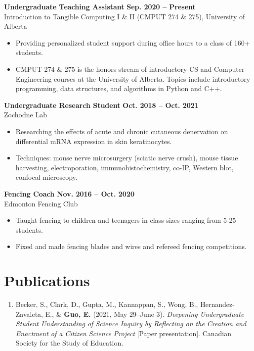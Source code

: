 \documentclass{article}
\begin{document}
\textbf{Undergraduate Teaching Assistant} \hfill \textbf{Sep. 2020 -- Present}\\
Introduction to Tangible Computing I \& II (CMPUT 274 \& 275), University of Alberta
\begin{itemize}
    \item Providing personalized student support during office hours to a class of 160+ students.
    \item CMPUT 274 \& 275 is the honors stream of introductory CS and Computer Engineering courses at the University of Alberta. Topics include introductory programming, data structures, and algorithms in Python and C++.
\end{itemize}

\textbf{Undergraduate Research Student} \hfill \textbf{Oct. 2018 -- Oct. 2021}\\
Zochodne Lab
\begin{itemize}
    \item Researching the effects of acute and chronic cutaneous denervation on differential mRNA expression in skin keratinocytes.
    \item Techniques: mouse nerve microsurgery (sciatic nerve crush), mouse tissue harvesting, electroporation, immunohistochemistry, co-IP, Western blot, confocal microscopy.
\end{itemize}

\textbf{Fencing Coach} \hfill \textbf{Nov. 2016 -- Oct. 2020}\\
Edmonton Fencing Club
\begin{itemize}
    \item Taught fencing to children and teenagers in class sizes ranging from 5-25 students.
    \item Fixed and made fencing blades and wires and refereed fencing competitions.
\end{itemize}


\section*{\textcolor{my_colour}{Publications}}
\vspace{-.25em} \hrulefill \vspace{.75em}
\vspace{-.5em}
\begin{enumerate}[leftmargin=!, itemindent=-.55cm]
    \item Becker, S., Clark, D., Gupta, M., Kannappan, S., Wong, B., Hernandez-Zavaleta, E., \& \textbf{Guo, E.} (2021, May 29--June 3). \textit{Deepening Undergraduate Student Understanding of Science Inquiry by Reflecting on the Creation and Enactment of a Citizen Science Project} [Paper presentation]. Canadian Society for the Study of Education.
\end{enumerate}
\end{document}
